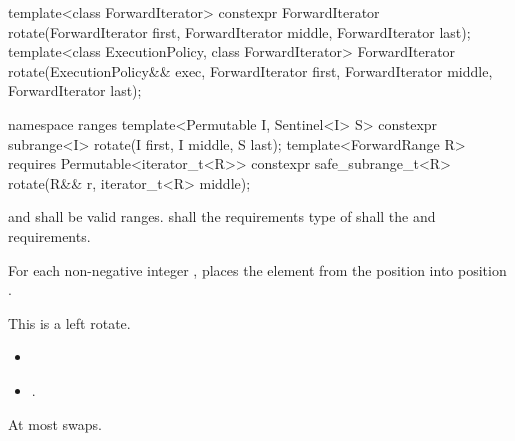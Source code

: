 %
\begin{itemdecl}
template<class ForwardIterator>
  constexpr ForwardIterator
    rotate(ForwardIterator first, ForwardIterator middle, ForwardIterator last);
template<class ExecutionPolicy, class ForwardIterator>
  ForwardIterator
    rotate(ExecutionPolicy&& exec,
           ForwardIterator first, ForwardIterator middle, ForwardIterator last);
\end{itemdecl}
\begin{addedblock}
\begin{itemdecl}
namespace ranges {
  template<Permutable I, Sentinel<I> S>
    constexpr subrange<I> rotate(I first, I middle, S last);
  template<ForwardRange R>
    requires Permutable<iterator_t<R>>
    constexpr safe_subrange_t<R> rotate(R&& r, iterator_t<R> middle);
}
\end{itemdecl}
\end{addedblock}

\begin{itemdescr}
\pnum
\requires
{}
and
shall be valid ranges.
 shall  the
requirements
type of  shall 
the  and
 requirements.

\pnum
\effects
For each non-negative integer
,
places the element from the position
into position
.
\begin{addedblock}
\begin{note}
This is a left rotate.
\end{note}
\end{addedblock}

\pnum
\returns
\begin{itemize}
\item {} 
\item {}.
\end{itemize}

\pnum
{}

\pnum
\complexity
At most
swaps.
\end{itemdescr}


